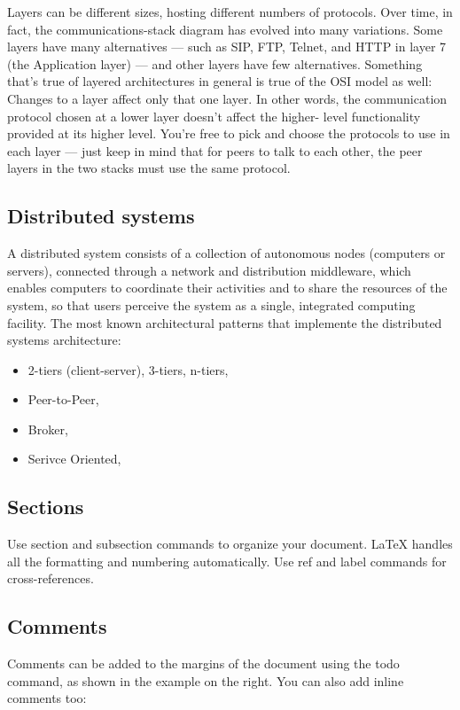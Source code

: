 Layers can be different sizes, hosting different numbers of protocols. Over time, in fact, the communications-stack diagram has evolved into many variations. Some layers have many alternatives — such as SIP, FTP, Telnet, and HTTP in layer 7 (the Application layer) — and other layers have few alternatives.
Something that’s true of layered architectures in general is true of the OSI model as well: Changes to a layer affect only that one layer. In other words, the communication protocol chosen at a lower layer doesn’t affect the higher- level functionality provided at its higher level. You’re free to pick and choose the protocols to use in each layer — just keep in mind that for peers to talk to each other, the peer layers in the two stacks must use the same protocol.

\subsection{Distributed systems}
A distributed system consists of a collection of autonomous nodes (computers or servers), connected through a network and distribution middleware, which enables computers to coordinate their activities and to share the resources of the system, so that users perceive the system as a single, integrated computing facility.
The most known architectural patterns that implemente the distributed systems architecture:
\begin{itemize}
\item 2-tiers (client-server), 3-tiers, n-tiers,
\item Peer-to-Peer,
\item Broker,
\item Serivce Oriented,
\end{itemize}

\subsection{Sections}

Use section and subsection commands to organize your document. \LaTeX{} handles all the formatting and numbering automatically. Use ref and label commands for cross-references.

\subsection{Comments}

Comments can be added to the margins of the document using the  todo command, as shown in the example on the right. You can also add inline comments too:

